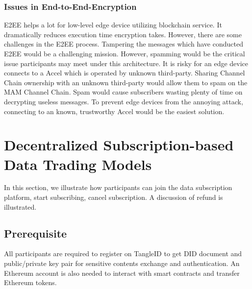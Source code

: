 \documentclass[conference]{IEEEtran}
\begin{document}
\subsubsection{Issues in End-to-End-Encryption}
E2EE helps a lot for low-level edge device utilizing blockchain service. It dramatically reduces execution time encryption takes. However, there are some challenges in the E2EE process. Tampering the messages which have conducted E2EE would be a challenging mission. However, spamming would be the critical issue participants may meet under this architecture. It is risky for an edge device connects to a Accel which is operated by unknown third-party. Sharing Channel Chain ownership with an unknown third-party would allow them to spam on the MAM Channel Chain. Spam would cause subscribers wasting plenty of time on decrypting useless messages. To prevent edge devices from the annoying attack, connecting to an known, trustworthy Accel would be the easiest solution.

\section{Decentralized Subscription-based Data Trading Models}
\label{section:trading_model}
In this section, we illustrate how participants can join the data subscription platform, start subscribing, cancel subscription. A discussion of refund is illustrated.

\subsection{Prerequisite}
All participants are required to register on TangleID to get DID document and public/private key pair for sensitive contents exchange and authentication. An Ethereum account is also needed to interact with smart contracts and transfer Ethereum tokens.
\end{document}
